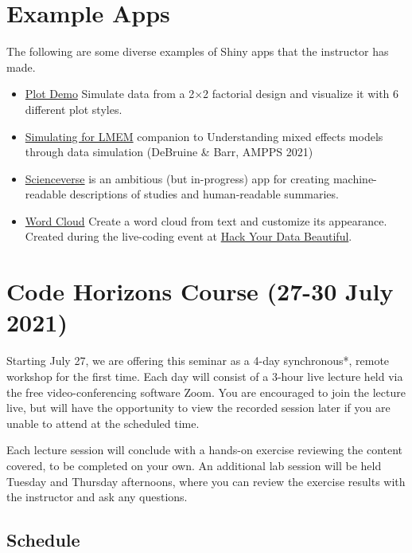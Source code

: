 \documentclass[
]{book}
\providecommand{\tightlist}{%
  \setlength{\itemsep}{0pt}\setlength{\parskip}{0pt}}
\begin{document}
\hypertarget{example-apps}{%
\section{Example Apps}\label{example-apps}}

The following are some diverse examples of Shiny apps that the instructor has made.

\begin{itemize}
\tightlist
\item
  \href{https://shiny.psy.gla.ac.uk/debruine/plotdemo/}{Plot Demo} Simulate data from a 2×2 factorial design and visualize it with 6 different plot styles.
\item
  \href{https://shiny.psy.gla.ac.uk/lmem_sim/}{Simulating for LMEM} companion to Understanding mixed effects models through data simulation (DeBruine \& Barr, AMPPS 2021)
\item
  \href{http://shiny.ieis.tue.nl/scienceverse/}{Scienceverse} is an ambitious (but in-progress) app for creating machine-readable descriptions of studies and human-readable summaries.
\item
  \href{https://shiny.psy.gla.ac.uk/debruine/wordcloud/}{Word Cloud} Create a word cloud from text and customize its appearance. Created during the live-coding event at \href{https://psyteachr.github.io/hack-your-data/}{Hack Your Data Beautiful}.
\end{itemize}

\hypertarget{code-horizons-course-27-30-july-2021}{%
\section{Code Horizons Course (27-30 July 2021)}\label{code-horizons-course-27-30-july-2021}}

Starting July 27, we are offering this seminar as a 4-day synchronous*, remote workshop for the first time. Each day will consist of a 3-hour live lecture held via the free video-conferencing software Zoom. You are encouraged to join the lecture live, but will have the opportunity to view the recorded session later if you are unable to attend at the scheduled time.

Each lecture session will conclude with a hands-on exercise reviewing the content covered, to be completed on your own. An additional lab session will be held Tuesday and Thursday afternoons, where you can review the exercise results with the instructor and ask any questions.

\hypertarget{schedule}{%
\subsection{Schedule}\label{schedule}}
\end{document}
